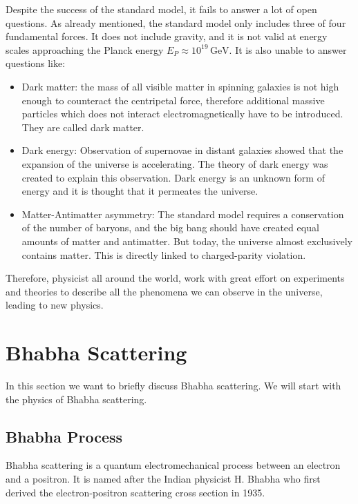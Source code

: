 \documentclass[a4paper,11pt,twosided,final,german,openbib,pdftex,listof=totoc,bibliography=totoc]{scrbook}
\begin{document}
Despite the success of the standard model, it fails to answer a lot of open questions. As already mentioned, the standard model only includes three of four fundamental forces. It does not include gravity, and it is not valid at energy scales approaching the Planck energy $E_P \approx 10^{19}\,\textrm{GeV} $.\cite{sivaram2007special} It is also unable to answer questions like:

\begin{itemize}
	
\item Dark matter: the mass of all visible matter in spinning galaxies is not high enough to counteract the centripetal force, therefore additional massive particles which does not interact electromagnetically have to be introduced. They are called dark matter.\cite{DarkMAtter}


\item Dark energy: Observation of supernovae in distant galaxies showed that the expansion of the universe is accelerating. The theory of dark energy was created to explain this observation. Dark energy is an unknown form of energy and it is thought that it permeates the universe.\cite{Janka}


\item  Matter-Antimatter asymmetry: The standard model requires a conservation of the number of baryons, and the big bang should have created equal amounts of matter and antimatter. But today, the universe almost exclusively contains matter. This is directly linked to charged-parity violation.\cite{HAMBYE2012193}


\end{itemize}

Therefore, physicist all around the world, work with great effort on experiments and theories to describe all the phenomena we can observe in the universe, leading to new physics.

\section{Bhabha Scattering}
\label{sec:Bhabha}

In this section we want to briefly discuss Bhabha scattering. We will start with the physics of Bhabha scattering.
 
\subsection{Bhabha Process}
 \label{sec:BhabhaProcess}
 Bhabha scattering is a quantum electromechanical process between an electron and a positron. It is named after the Indian  physicist H. Bhabha who first derived the electron-positron scattering cross section in 1935.\cite{Bhabha}
 
\end{document}
